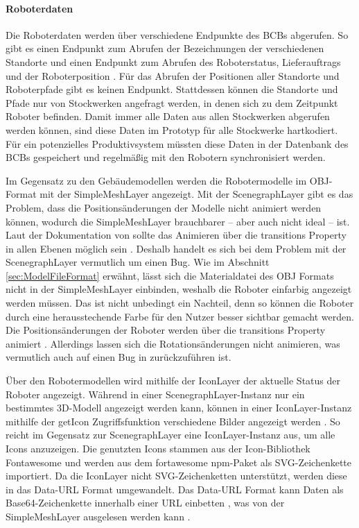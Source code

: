 \paragraph{Roboterdaten}\label{sec:RobotData}
Die Roboterdaten werden über verschiedene Endpunkte des \ac{BCB}s abgerufen. So gibt es einen Endpunkt zum Abrufen der Bezeichnungen der verschiedenen Standorte \cite[Endpunkt~3]{BCBSwagger} und einen Endpunkt zum Abrufen des Roboterstatus, Lieferauftrags und der Roboterposition \cite[Endpunkt~29]{BCBSwagger}. Für das Abrufen der Positionen aller Standorte und Roboterpfade gibt es keinen Endpunkt. Stattdessen können die Standorte und Pfade nur von Stockwerken angefragt werden, in denen sich zu dem Zeitpunkt Roboter befinden. Damit immer alle Daten aus allen Stockwerken abgerufen werden können, sind diese Daten im Prototyp für alle Stockwerke hartkodiert. Für ein potenzielles Produktivsystem müssten diese Daten in der Datenbank des \ac{BCB}s gespeichert und regelmäßig mit den Robotern synchronisiert werden.

Im Gegensatz zu den Gebäudemodellen werden die Robotermodelle im \ac{OBJ}-Format mit der SimpleMeshLayer \cite{DeckglSimpleMeshLayer} angezeigt. Mit der ScenegraphLayer gibt es das Problem, dass die Positionsänderungen der Modelle nicht animiert werden können, wodurch die SimpleMeshLayer brauchbarer – aber auch nicht ideal – ist. Laut der Dokumentation von \deckgl{} sollte das Animieren über die transitions Property in allen Ebenen möglich sein \cite{DeckglLayerClass}. Deshalb handelt es sich bei dem Problem mit der ScenegraphLayer vermutlich um einen Bug. Wie im Abschnitt \ref{sec:ModelFileFormat} erwähnt, lässt sich die Materialdatei des \ac{OBJ} Formats nicht in der SimpleMeshLayer einbinden, weshalb die Roboter einfarbig angezeigt werden müssen. Das ist nicht unbedingt ein Nachteil, denn so können die Roboter durch eine herausstechende Farbe für den Nutzer besser sichtbar gemacht werden. Die Positionsänderungen der Roboter werden über die transitions Property animiert \cite{DeckglLayerClass}. Allerdings lassen sich die Rotationsänderungen nicht animieren, was vermutlich auch auf einen Bug in \deckgl{} zurückzuführen ist.

Über den Robotermodellen wird mithilfe der IconLayer der aktuelle Status der Roboter angezeigt. Während in einer ScenegraphLayer-Instanz nur ein bestimmtes 3D-Modell angezeigt werden kann, können in einer IconLayer-Instanz mithilfe der getIcon Zugriffsfunktion verschiedene Bilder angezeigt werden \cite{DeckglIconLayer}. So reicht im Gegensatz zur ScenegraphLayer eine IconLayer-Instanz aus, um alle Icons anzuzeigen. Die genutzten Icons stammen aus der Icon-Bibliothek Fontawesome und werden aus dem fortawesome \ac{npm}-Paket als \ac{SVG}-Zeichenkette importiert. Da die IconLayer nicht \ac{SVG}-Zeichenketten unterstützt, werden diese in das Data-\ac{URL} Format umgewandelt. Das Data-\ac{URL} Format kann Daten als \gls{Base64}-Zeichenkette innerhalb einer \ac{URL} einbetten \cite[S.~1]{DataUrlSpec}, was von der SimpleMeshLayer ausgelesen werden kann \cite{DeckglIconLayer}.

